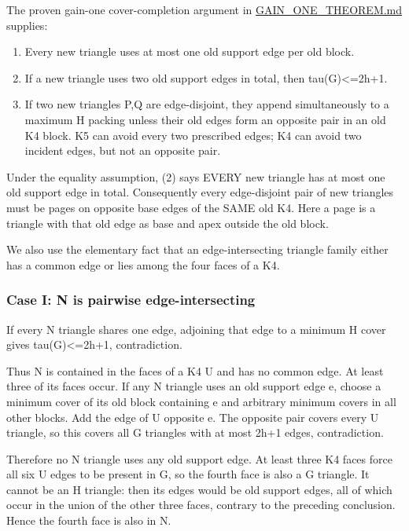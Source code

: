 \documentclass[11pt]{article}
\providecommand{\tightlist}{\setlength{\itemsep}{0pt}\setlength{\parskip}{0pt}}
\begin{document}
The proven gain-one cover-completion argument in \href{https://github.com/pappa211/ai-math-experiments/blob/main/problems/TUZA-07/notes/GAIN_ONE_THEOREM.md}{GAIN\_ONE\_THEOREM.md} supplies:

\begin{enumerate}
\def\labelenumi{\arabic{enumi}.}
\tightlist
\item
  Every new triangle uses at most one old support edge per old block.
\item
  If a new triangle uses two old support edges in total, then tau(G)\textless=2h+1.
\item
  If two new triangles P,Q are edge-disjoint, they append simultaneously to a maximum H packing unless their old edges form an opposite pair in an old K4 block. K5 can avoid every two prescribed edges; K4 can avoid two incident edges, but not an opposite pair.
\end{enumerate}

Under the equality assumption, (2) says EVERY new triangle has at most one old support edge in total. Consequently every edge-disjoint pair of new triangles must be pages on opposite base edges of the SAME old K4. Here a page is a triangle with that old edge as base and apex outside the old block.

We also use the elementary fact that an edge-intersecting triangle family either has a common edge or lies among the four faces of a K4.

\subsubsection{Case I: N is pairwise edge-intersecting}\label{case-i-n-is-pairwise-edge-intersecting}

If every N triangle shares one edge, adjoining that edge to a minimum H cover gives tau(G)\textless=2h+1, contradiction.

Thus N is contained in the faces of a K4 U and has no common edge. At least three of its faces occur. If any N triangle uses an old support edge e, choose a minimum cover of its old block containing e and arbitrary minimum covers in all other blocks. Add the edge of U opposite e. The opposite pair covers every U triangle, so this covers all G triangles with at most 2h+1 edges, contradiction.

Therefore no N triangle uses any old support edge. At least three K4 faces force all six U edges to be present in G, so the fourth face is also a G triangle. It cannot be an H triangle: then its edges would be old support edges, all of which occur in the union of the other three faces, contrary to the preceding conclusion. Hence the fourth face is also in N.
\end{document}
